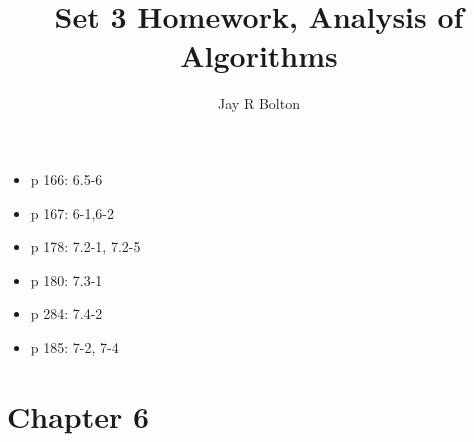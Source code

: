 \documentclass{article}
\title{Set 3 Homework, Analysis of Algorithms}
\author{Jay R Bolton}
\begin{document}
\maketitle

\begin{itemize}
\item p 166: 6.5-6
\item p 167: 6-1,6-2
\item p 178: 7.2-1, 7.2-5
\item p 180: 7.3-1
\item p 284: 7.4-2
\item p 185: 7-2, 7-4
\end{itemize}

\section*{Chapter 6}
\end{document}
